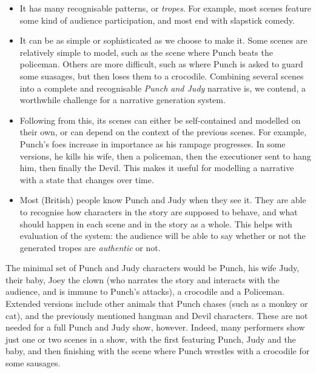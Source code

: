 \documentclass[11pt]{report}
\begin{document}
\begin{itemize}
\item It has many recognisable patterns, or \emph{tropes}. For example, most
  scenes feature some kind of audience participation, and most end with
  slapstick comedy.
\item It can be as simple or sophisticated as we choose to make it. Some scenes
  are relatively simple to model, such as the scene where Punch beats the
  policeman. Others are more difficult, such as where Punch is asked to guard
  some suasages, but then loses them to a crocodile. Combining several scenes
  into a complete and recognisable \emph{Punch and Judy} narrative is, we
  contend, a worthwhile challenge for a narrative generation system.
\item Following from this, its scenes can either be self-contained and modelled
  on their own, or can depend on the context of the previous scenes. For
  example, Punch's foes increase in importance as his rampage progresses. In some
  versions, he kills his wife, then a policeman, then the executioner sent to
  hang him, then finally the Devil. This makes it useful for modelling a
  narrative with a state that changes over time.
\item Most (British) people know Punch and Judy when they see it. They are able
  to recognise how characters in the story are supposed to behave, and what
  should happen in each scene and in the story as a whole. This helps with
  evaluation of the system: the audience will be able to say whether or not the
  generated tropes are \emph{authentic} or not.
\end{itemize}

The minimal set of Punch and Judy characters would be Punch, his wife Judy,
their baby, Joey the clown (who narrates the story and interacts with the
audience, and is immune to Punch's attacks), a crocodile and a Policeman.
Extended versions include other animals that Punch chases (such as a monkey or
cat), and the previously mentioned hangman and Devil characters. These are not
needed for a full Punch and Judy show, however. Indeed, many performers show
just one or two scenes in a show, with the first featuring Punch, Judy and the
baby, and then finishing with the scene where Punch wrestles with a crocodile
for some sausages.
\end{document}
